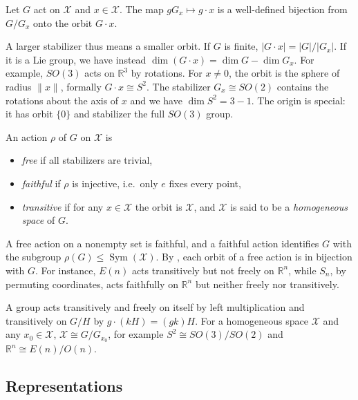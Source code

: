 \documentclass[mathematics,review,submit,moreauthors]{Definitions/mdpi}
\begin{document}
\begin{Theorem}\label{thm:orbit-stabilizer}
    Let $G$ act on $\mathcal{X}$ and $x\in\mathcal{X}$.
    The map $gG_x\mapsto g\cdot x$ is a well-defined bijection from $G/G_x$ onto the orbit $G\cdot x$.
\end{Theorem}

A larger stabilizer thus means a smaller orbit.
If $G$ is finite, $|G\cdot x|=|G|/|G_x|$.
If it is a Lie group, we have instead $\dim(G\cdot x)=\dim G-\dim G_x$.
For example, $SO(3)$ acts on $\mathbb{R}^3$ by rotations.
For $x\neq0$, the orbit is the sphere of radius $\lVert x\rVert$, formally $G\cdot x\cong S^2$. 
The stabilizer $G_x\cong SO(2)$ contains the rotations about the axis of $x$ and we have $\dim S^2=3-1$.
The origin is special: it has orbit $\{0\}$ and stabilizer the full $SO(3)$ group.

\begin{Definition}\label{def:free-transitive}
    An action $\rho$ of $G$ on $\mathcal{X}$ is
    \begin{itemize}
        \item \emph{free} if all stabilizers are trivial,
        \item \emph{faithful} if $\rho$ is injective, i.e.\ only $e$ fixes every point,
        \item \emph{transitive} if for any $x\in \mathcal{X}$ the orbit is $\mathcal{X}$, and $\mathcal{X}$ is said to be a \emph{homogeneous space} of $G$.
    \end{itemize}
\end{Definition}

A free action on a nonempty set is faithful, and a faithful action identifies $G$ with the subgroup $\rho(G)\le\operatorname{Sym}(\mathcal{X})$.
By , each orbit of a free action is in bijection with $G$.
For instance, $E(n)$ acts transitively but not freely on $\mathbb{R}^n$, while $S_n$, by permuting coordinates, acts faithfully on $\mathbb{R}^n$ but neither freely nor transitively.

A group acts transitively and freely on itself by left multiplication and transitively on $G/H$ by $g\cdot(kH)=(gk)H$.
For a homogeneous space $\mathcal{X}$ and any $x_0\in \mathcal{X}$, $\mathcal{X}\cong G/G_{x_0}$, for example $S^2\cong SO(3)/SO(2)$ and $\mathbb{R}^n\cong E(n)/O(n)$.

\subsection{Representations}\label{sec:representations}
\end{document}
